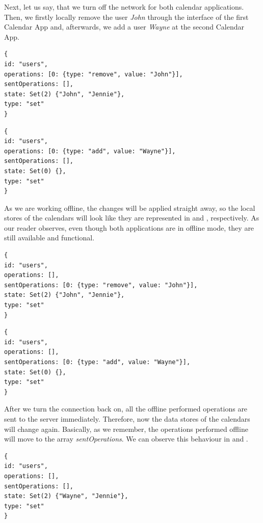 Next, let us say, that we turn off the network for both calendar applications. Then, we firstly locally remove the user \textit{John} through the interface of the first Calendar App and, afterwards, we add a user \textit{Wayne} at the second Calendar App.

\begin{lstlisting}[caption={The state of the users object store after offline changes at the first Calendar App.}, label={lst:ev4}]
{
id: "users",
operations: [0: {type: "remove", value: "John"}],
sentOperations: [],
state: Set(2) {"John", "Jennie"},
type: "set"
}
\end{lstlisting}
\begin{lstlisting}[caption={The state of the users object store after offline changes at the second Calendar App.}, label={lst:ev5}]
{
id: "users",
operations: [0: {type: "add", value: "Wayne"}],
sentOperations: [],
state: Set(0) {},
type: "set"
}
\end{lstlisting}

As we are working offline, the changes will be applied straight away, so the local stores of the calendars will look like they are represented in  and , respectively. As our reader observes, even though both applications are in offline mode, they are still available and functional. 

\begin{lstlisting}[caption={The state of the users object store after the connection is enabled at the first Calendar App.}, label={lst:ev6}]
{
id: "users",
operations: [],
sentOperations: [0: {type: "remove", value: "John"}],
state: Set(2) {"John", "Jennie"},
type: "set"
}
\end{lstlisting}
\begin{lstlisting}[caption={The state of the users object store after the connection is enabled at the second Calendar App.}, label={lst:ev7}]
{
id: "users",
operations: [],
sentOperations: [0: {type: "add", value: "Wayne"}],
state: Set(0) {},
type: "set"
}
\end{lstlisting}

After we turn the connection back on, all the offline performed operations are sent to the server immediately. Therefore, now the data stores of the calendars will change again. Basically, as we remember, the operations performed offline will move to the array \textit{sentOperations}. We can observe this behaviour in  and .

\begin{lstlisting}[caption={The state of the users object store for both calendars.}, label={lst:ev8}]
{
id: "users",
operations: [],
sentOperations: [],
state: Set(2) {"Wayne", "Jennie"},
type: "set"
}
\end{lstlisting}

